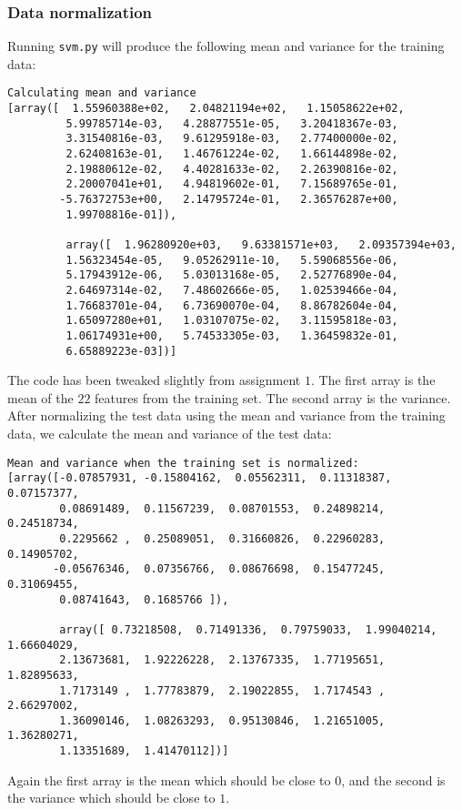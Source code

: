 \documentclass[a4paper]{article}
\begin{document}
\subsubsection{Data normalization}
Running \texttt{svm.py} will produce the following mean and variance for the training data:
\begin{verbatim}
Calculating mean and variance
[array([  1.55960388e+02,   2.04821194e+02,   1.15058622e+02,
         5.99785714e-03,   4.28877551e-05,   3.20418367e-03,
         3.31540816e-03,   9.61295918e-03,   2.77400000e-02,
         2.62408163e-01,   1.46761224e-02,   1.66144898e-02,
         2.19880612e-02,   4.40281633e-02,   2.26390816e-02,
         2.20007041e+01,   4.94819602e-01,   7.15689765e-01,
        -5.76372753e+00,   2.14795724e-01,   2.36576287e+00,
         1.99708816e-01]),

         array([  1.96280920e+03,   9.63381571e+03,   2.09357394e+03,
         1.56323454e-05,   9.05262911e-10,   5.59068556e-06,
         5.17943912e-06,   5.03013168e-05,   2.52776890e-04,
         2.64697314e-02,   7.48602666e-05,   1.02539466e-04,
         1.76683701e-04,   6.73690070e-04,   8.86782604e-04,
         1.65097280e+01,   1.03107075e-02,   3.11595818e-03,
         1.06174931e+00,   5.74533305e-03,   1.36459832e-01,
         6.65889223e-03])]
\end{verbatim}
The code has been tweaked slightly from assignment $1$. The first array is the mean of the $22$ features from the training set. The second array is the variance. \\
After normalizing the test data using the mean and variance from the training data, we calculate the mean and variance of the test data:
\begin{verbatim}
Mean and variance when the training set is normalized:
[array([-0.07857931, -0.15804162,  0.05562311,  0.11318387,  0.07157377,
        0.08691489,  0.11567239,  0.08701553,  0.24898214,  0.24518734,
        0.2295662 ,  0.25089051,  0.31660826,  0.22960283,  0.14905702,
       -0.05676346,  0.07356766,  0.08676698,  0.15477245,  0.31069455,
        0.08741643,  0.1685766 ]),

        array([ 0.73218508,  0.71491336,  0.79759033,  1.99040214,  1.66604029,
        2.13673681,  1.92226228,  2.13767335,  1.77195651,  1.82895633,
        1.7173149 ,  1.77783879,  2.19022855,  1.7174543 ,  2.66297002,
        1.36090146,  1.08263293,  0.95130846,  1.21651005,  1.36280271,
        1.13351689,  1.41470112])]
\end{verbatim}
Again the first array is the mean which should be close to $0$, and the second is the variance which should be close to $1$.
\end{document}

